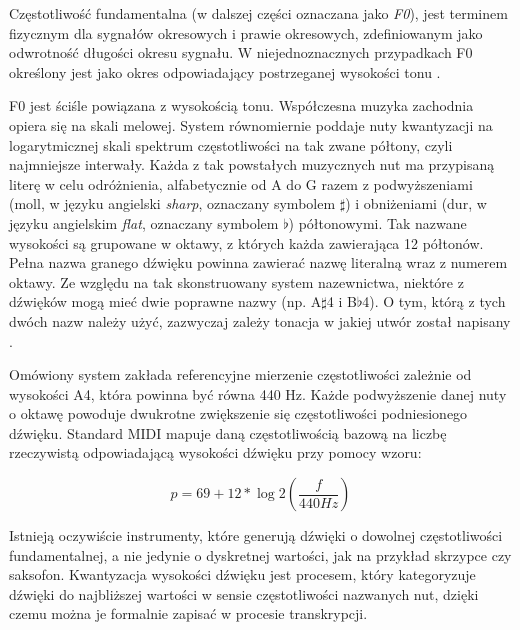 \documentclass[12pt,a4paper,twoside]{mwart}
\begin{document}
Częstotliwość fundamentalna (w dalszej części oznaczana jako \textit{F0}), jest terminem fizycznym dla sygnałów okresowych i prawie okresowych, zdefiniowanym jako odwrotność długości okresu sygnału. W niejednoznacznych przypadkach F0 określony jest jako okres odpowiadający postrzeganej wysokości tonu 
\cite[8]{Transcription:Anssi:SignalProcessingMethods}.


F0 jest ściśle powiązana z wysokością tonu. Współczesna muzyka zachodnia opiera się na skali melowej. System równomiernie poddaje nuty kwantyzacji na logarytmicznej skali spektrum częstotliwości na tak zwane półtony, czyli najmniejsze interwały. Każda z tak powstałych muzycznych nut ma przypisaną literę w celu odróżnienia, alfabetycznie od A do G razem z podwyższeniami (moll, w języku angielski \textit{sharp}, oznaczany symbolem $\sharp$) i obniżeniami (dur, w języku angielskim \textit{flat}, oznaczany symbolem $\flat$) półtonowymi. Tak nazwane wysokości są grupowane w oktawy, z których każda zawierająca 12 półtonów. Pełna nazwa granego dźwięku powinna zawierać nazwę literalną wraz z numerem oktawy. Ze względu na tak skonstruowany system nazewnictwa, niektóre z dźwięków mogą mieć dwie poprawne nazwy (np. A$\sharp$4 i B$\flat$4). O tym, którą z tych dwóch nazw należy użyć, zazwyczaj zależy tonacja w jakiej utwór został napisany 
\cite[215-220]{Transcription:Burns:InversalScalesTuning}.

Omówiony system zakłada referencyjne mierzenie częstotliwości zależnie od wysokości A4, która powinna być równa 440 Hz. Każde podwyższenie danej nuty o oktawę powoduje dwukrotne zwiększenie się częstotliwości podniesionego dźwięku. Standard MIDI
\cite[67-71]{Homerecording:LevelUp}
mapuje daną częstotliwością bazową na liczbę rzeczywistą odpowiadającą wysokości dźwięku przy pomocy wzoru:

\begin{equation} \label{eq:midi_freq}
p = 69 + 12 * \log{2}(\frac{f}{440 Hz})
\end{equation}

Istnieją oczywiście instrumenty, które generują dźwięki o dowolnej częstotliwości fundamentalnej, a nie jedynie o dyskretnej wartości, jak na przykład skrzypce czy saksofon. Kwantyzacja wysokości dźwięku jest procesem, który kategoryzuje dźwięki do najbliższej wartości w sensie częstotliwości nazwanych nut, dzięki czemu można je formalnie zapisać w procesie transkrypcji.
\end{document}
